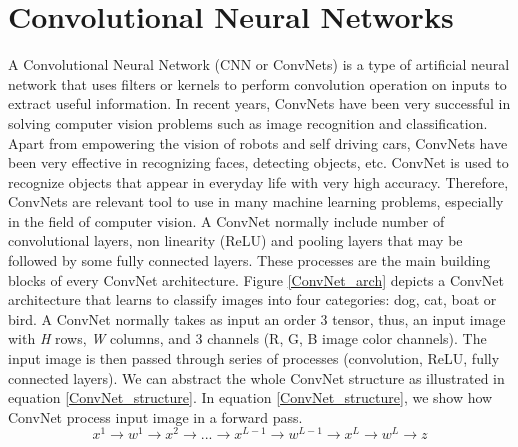 \documentclass[master]{thesis-uestc}
\begin{document}

\section{Convolutional Neural Networks}
A Convolutional Neural Network (CNN or ConvNets) is a type of artificial neural network that uses filters or kernels to perform convolution operation on inputs to extract useful information. In recent years, ConvNets have been very successful in solving computer vision problems such as image recognition and classification. Apart from empowering the vision of robots and self driving cars, ConvNets have been very effective in recognizing faces, detecting objects, etc. ConvNet is used to recognize objects that appear in everyday life with very high accuracy. Therefore, ConvNets are relevant tool to use in many machine learning problems, especially in the field of computer vision. A ConvNet normally include number of convolutional layers, non linearity (ReLU) and pooling layers that may be followed by some fully connected layers. These processes are the main building blocks of every ConvNet architecture. Figure \ref{ConvNet_arch} depicts a ConvNet architecture that learns to classify images into four categories: dog, cat, boat or bird. A ConvNet normally takes as input an order 3 tensor, thus, an input image with \textit{H} rows, \textit{W} columns, and 3 channels (R, G, B image color channels). The input image is then passed through series of processes (convolution, ReLU, fully connected layers). We can abstract the whole ConvNet structure as illustrated in equation \ref{ConvNet_structure}. In equation \ref{ConvNet_structure}, we show how ConvNet process input image in a forward pass.
\begin{equation}
x^1 \rightarrow \boxed{ w^1 } \rightarrow  x^2 \rightarrow ... \rightarrow  x^{L-1} \rightarrow \boxed{ w^{L-1} } \rightarrow  x^L  \rightarrow \boxed{ w^L }  \rightarrow z
\label{ConvNet_structure}
\end{equation}
\end{document}
